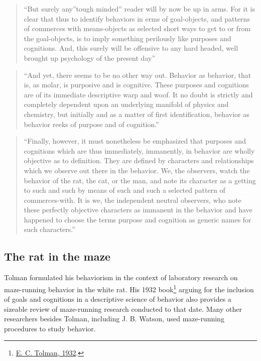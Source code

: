 \documentclass[
  oneside,
  12pt]{crumpbook}
\begin{document}
\begin{quote}
``But surely any''tough minded'' reader will by now be up in arms. For it is clear that thus to identify behaviors in erms of goal-objects, and patterns of commerces with means-objects as selected short ways to get to or from the goal-objects, is to imply something perilously like purposes and cognitions. And, this surely will be offensive to any hard headed, well brought up psychology of the present day''
\end{quote}

\begin{quote}
``And yet, there seems to be no other way out. Behavior as behavior, that is, as molar, is purposive and is cognitive. These purposes and cognitions are of its immediate descriptive warp and woof. It no doubt is strictly and completely dependent upon an underlying manifold of physics and chemistry, but initially and as a matter of first identification, behavior as behavior reeks of purpose and of cognition.''
\end{quote}

\begin{quote}
``Finally, however, it must nonetheless be emphasized that purposes and cognitions which are thus immediately, immanently, in behavior are wholly objective as to definition. They are defined by characters and relationships which we observe out there in the behavior. We, the observers, watch the behavior of the rat, the cat, or the man, and note its character as a getting to such and such by means of such and such a selected pattern of commerces-with. It is we, the independent neutral observers, who note these perfectly objective characters as immanent in the behavior and have happened to choose the terms purpose and cognition as generic names for such characters.''
\end{quote}

\hypertarget{the-rat-in-the-maze}{%
\subsection{The rat in the maze}\label{the-rat-in-the-maze}}

Tolman formulated his behaviorism in the context of laboratory research on maze-running behavior in the white rat. His 1932 book\footnote{\protect\hyperlink{ref-tolmanPurposiveBehaviorAnimal1932}{E. C. Tolman, 1932}.} arguing for the inclusion of goals and cognitions in a descriptive science of behavior also provides a sizeable review of maze-running research conducted to that date. Many other researchers besides Tolman, including J. B. Watson, used maze-running procedures to study behavior.
\end{document}
